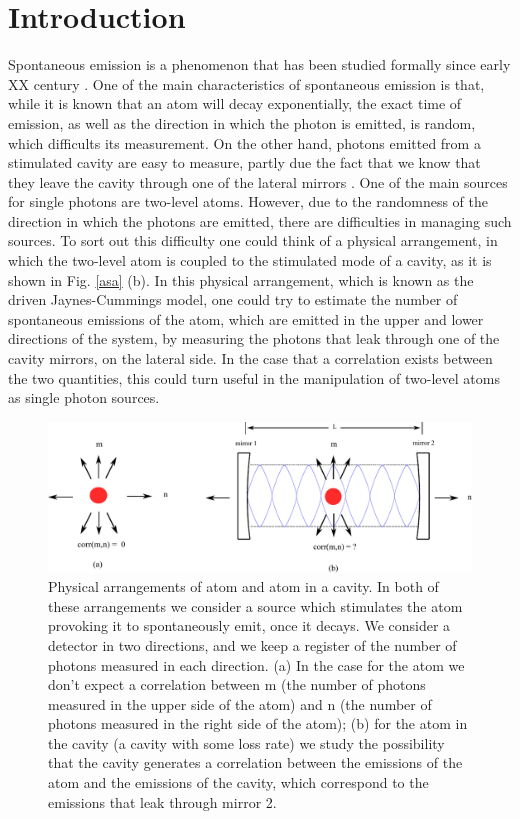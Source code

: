 \documentclass[conference]{IEEEtran}
\begin{document}
\section{Introduction}
Spontaneous emission is a phenomenon that has been studied formally since early XX century \cite{10.2307/94746, 1917PhyZ...18..121E}. One of the main characteristics of spontaneous emission is that, while it is known that an atom will decay exponentially, the exact time of emission, as well as the direction in  which the photon is emitted, is random, which difficults its measurement. On the other hand, photons emitted from a stimulated cavity are easy to measure, partly due the fact that we know that they leave the cavity through one of the lateral mirrors \cite{326305, doi:10.1063/1.113345}. One of the main sources for single photons are two-level atoms. However, due to the randomness of the direction in which the photons are emitted, there are difficulties in managing such sources. To sort out this difficulty one could think of a physical arrangement, in which the two-level atom is coupled to the stimulated mode of a cavity, as it is shown in Fig. \ref{asa} (b). In this physical arrangement, which is known as the driven Jaynes-Cummings model, one could try to estimate the number of spontaneous emissions of the atom, which are emitted in the upper and lower directions of the system, by measuring the photons that leak through one of the cavity mirrors, on the lateral side. In the case that a correlation exists between the two quantities, this could turn useful in the manipulation of two-level atoms as single photon sources. 
\begin{center}
\begin{figure}\label{asa}
\begin{center}
\includegraphics[scale = 0.65]{newimagepaper.pdf}
\caption{\small{Physical arrangements of atom and atom in a cavity. In both of these arrangements we consider a source which stimulates the atom provoking it to spontaneously emit, once it decays. We consider a detector in two directions, and we keep a register of the number of photons measured in each direction. (a) In the case for the atom we don't expect a correlation between m (the number of photons measured in the upper side of the atom) and n (the number of photons measured in the right side of the atom); (b) for the atom in the cavity (a cavity with some loss rate) we study the possibility that the cavity generates a correlation between the emissions of the atom and the emissions of the cavity, which correspond to the emissions that leak through mirror 2.}} \label{probdisult}
\end{center}
\end{figure}
\end{center}
\end{document}
